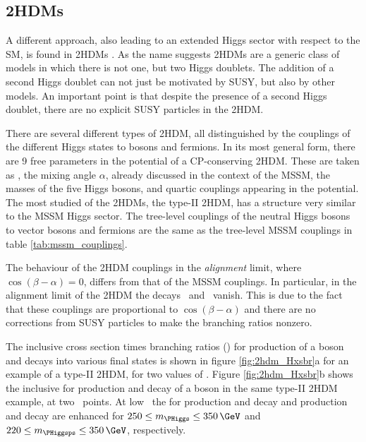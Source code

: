 \subsection{\acl{2HDM}s}
\label{sec:theory_2HDM}
A different approach, also leading to an extended Higgs sector with
respect to the \ac{SM}, is found in \acp{2HDM} \cite{2HDM-I,2HDM-II}.
As the name suggests \acp{2HDM} are a generic class of models in which
there is not one, but two Higgs doublets. The addition of a second
Higgs doublet can not just be motivated by \ac{SUSY}, but also by other models.
An important point is that despite the presence of a second 
Higgs doublet, there are no explicit \ac{SUSY} particles in the \ac{2HDM}.

There are several different types of \ac{2HDM}, all distinguished by the couplings
of the different Higgs states to bosons and fermions. In its most general
form, there are 9 free parameters in the potential of a CP-conserving 2HDM. 
These are taken as \tanb, the mixing angle $\alpha$, already discussed in 
the context of the \ac{MSSM}, the masses of the five Higgs bosons,
and quartic couplings appearing in the potential. The most studied of the
\ac{2HDM}s, the type-II \ac{2HDM}, has a structure very similar to 
the MSSM Higgs sector. The tree-level couplings of the neutral Higgs bosons to 
vector bosons and fermions are the same as the tree-level \ac{MSSM} couplings 
in table \ref{tab:mssm_couplings}. %

The behaviour of the \ac{2HDM} couplings in the \textit{alignment} limit,
where $\cos{(\beta-\alpha)} = 0$, differs from that of the \ac{MSSM} couplings.
In particular, in the alignment limit of the \ac{2HDM} the decays \AtoZh~and \Htohh~vanish.
This is due to the fact that these couplings are
proportional to $\cos{(\beta-\alpha)}$ and there are no corrections
from \ac{SUSY} particles to make the branching ratios nonzero.

The inclusive cross section times branching ratios (\xsbr) for production of a \PHiggs boson 
and decays into various final states is shown in figure \ref{fig:2hdm_Hxsbr}a for an 
example of a type-II \ac{2HDM}, for two values of \tanb. Figure \ref{fig:2hdm_Hxsbr}b 
shows the inclusive \xsbr for production and decay
of a \PHiggsps boson in the same type-II \ac{2HDM} example, at two \tanb~points. At
low \tanb~the \xsbr for \Htohh production and decay and \AtoZh production
and decay are enhanced for $250\leq m_{\PHiggs}\leq 350\,\GeV$ and $220 \leq m_{\PHiggsps} \leq 350\,\GeV$, respectively.

